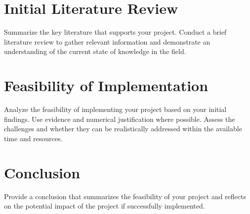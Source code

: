 \documentclass[a4paper, 11pt, twocolumn]{article}
\begin{document}
\section{Initial Literature Review}
\label{sec:litreview}
Summarize the key literature that supports your project. Conduct a brief literature review to gather relevant information and demonstrate an understanding of the current state of knowledge in the field.

\section{Feasibility of Implementation}
\label{sec:feasibility}
Analyze the feasibility of implementing your project based on your initial findings. Use evidence and numerical justification where possible. Assess the challenges and whether they can be realistically addressed within the available time and resources.

\section{Conclusion}
\label{sec:conclusion}
Provide a conclusion that summarizes the feasibility of your project and reflects on the potential impact of the project if successfully implemented.

\onecolumn
\end{document}
